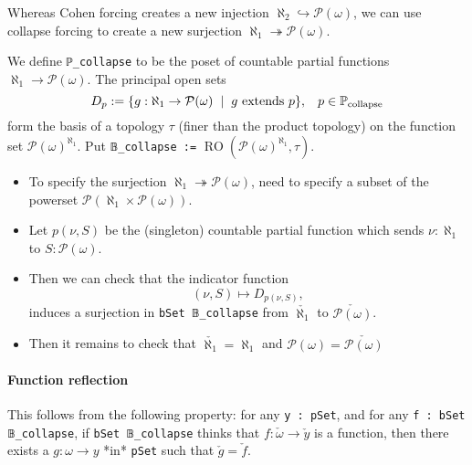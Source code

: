 \documentclass[sigplan,10pt,review, anonymous]{acmart}
\theoremstyle{definition}
\begin{document}
Whereas Cohen forcing creates a new injection \(\aleph_2 \hookrightarrow \mathcal{P}(\omega)\), we can use collapse forcing to create a new surjection \(\aleph_1 \twoheadrightarrow \mathcal{P}(\omega)\).

\begin{definition}\label{def-collapse-poset}
  We define \lstinline{ℙ_collapse} to be the poset of countable partial functions \(\aleph_1 \to \mathcal{P}(\omega)\). The principal open sets \[D_p := \{g : \aleph_1 \to \mathcal{P}(\omega) \hspace{2mm} | \hspace{2mm} g \text{ extends } p\} , \hspace{3mm} p \in \mathbb{P}_{\text{collapse}}\] form the basis of a topology \(\tau\) (finer than the product topology) on the function set \(\mathcal{P}(\omega)^{\aleph_1}\). Put \lstinline{𝔹_collapse :=} \(\operatorname{RO}\left(\mathcal{P}(\omega)^{\aleph_1}, \tau\right)\).
\end{definition}

\begin{itemize}
 \item To specify the surjection \(\aleph_1 \twoheadrightarrow \mathcal{P}(\omega)\), need to specify a subset of the powerset \(\mathcal{P}(\aleph_1 \times \mathcal{P}(\omega))\).

 \item Let \(p(\nu, S)\) be the (singleton) countable partial function which sends \(\nu : \aleph_1\) to \(S : \mathcal{P}(\omega)\).

 \item Then we can check that the indicator function
\[ (\nu, S) \mapsto D_{p(\nu,S)}, \]
induces a surjection in \lstinline{bSet 𝔹_collapse} from \(\check{\aleph_1}\) to \(\check{\mathcal{P}(\omega)}\).

 \item Then it remains to check that \(\check{\aleph_1} = \aleph_1\) and \(\mathcal{P}(\omega) = \check{\mathcal{P}(\omega)}\)  
\end{itemize}

\paragraph{Function reflection}

This follows from the following property: for any \lstinline{y : pSet}, and for any \lstinline{f : bSet 𝔹_collapse}, if \lstinline{bSet 𝔹_collapse} thinks that \(f : \check{\omega}  \to \check{y}\) is a function, then there exists a \(g : \omega \to y\) *in* \lstinline{pSet} such that \(\check{g} = \check{f}\).
\end{document}
